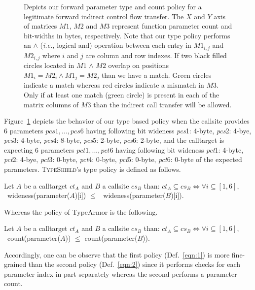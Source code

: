 \begin{figure}[H]
{\begin{tikzpicture}[shorten >=1pt,node distance=2cm,on grid,auto]
\end{tikzpicture}}
\caption{Depicts our forward parameter type and count policy for a legitimate
forward indirect control flow transfer.
The $X$ and $Y$ axis of matrices $M1$, $M2$ and $M3$ represent function parameter count 
and bit-widths in bytes, respectively.
Note that our type policy performs an $\wedge$ (\textit{i.e.,} logical and) operation
between each entry in $M1_{i,j}$ and $M2_{i,j}$ where $i$ and $j$ are column and row indexes. 
If two black filled circles located in $M1$ $\wedge$ $M2$ overlap on positions $M1_{i} = M2_{i} \wedge M1_{j} = M2_{j}$ than we have a match.
Green circles indicate a match whereas red circles indicate a mismatch in $M3$.
Only if at least one match (green circle) is present in each of the matrix columns of 
$M3$ than the indirect call transfer will be allowed.} 
\label{Type and parameter count policy.}
\end{figure}

Figure~\ref{Type and parameter count policy.} depicts
the behavior of our type based policy
when the callsite provides 6 parameters $pcs1, ..., pcs6$ having following bit 
wideness \textit{pcs}1: 4-byte, \textit{pcs}2: 4-bye, \textit{pcs}3: 4-byte, \textit{pcs}4: 8-byte, \textit{pcs}5: 2-byte, 
\textit{pcs}6: 2-byte, and the calltarget is expecting 6 parameters $pct1, ..., pct6$ having following bit 
wideness \textit{pct}1: 4-byte, \textit{pct}2: 4-bye, \textit{pct}3: 0-byte, \textit{pct}4: 0-byte, \textit{pct}5: 0-byte, 
\textit{pct}6: 0-byte of the expected parameters. 
\textsc{TypeShield}'s type policy is defined as follows. 
\begin{definition}

\label{eqn:1} Let $A$ be a calltarget $ct_{A}$ and $B$ a callsite $cs_{B}$ than: 
$ct_{A} \subseteq cs_{B} \iff \forall i \subseteq [1, 6],$
\ wideness(parameter($A$)[i]) $\leq$ \ wideness(parameter($B$)[i]).
\end{definition}
Whereas the policy of TypeArmor is the following. 
\begin{definition}
 \label{eqn:2}Let $A$ be a calltarget $ct_{A}$ and $B$ a callsite $cs_{B}$ than: 
$ct_{A} \subseteq cs_{B} \iff \forall i \subseteq [1, 6],$ 
\ count(parameter($A$)) $\leq$ count(parameter($B$)).
\end{definition}

Accordingly, one can be observe that 
the first policy (Def.~\eqref{eqn:1}) is more fine-grained than the second policy (Def.~\eqref{eqn:2}) since it performs checks 
for each parameter index in part separately whereas the second performs a parameter count.

